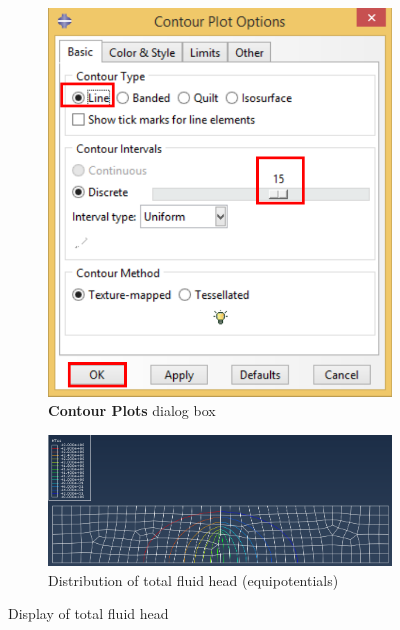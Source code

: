 \begin{itemize}
\begin{figure}[!h]
      \begin{subfigure}[!h]{0.40\textwidth}
        \includegraphics[width=\textwidth]{./body/images/post03.pdf}
        \caption{\textbf{Contour Plots} dialog box}
        \label{post03}
      \end{subfigure}%
      \begin{subfigure}[!h]{0.60\textwidth}
        \includegraphics[width=\textwidth]{./body/images/post04}
        \caption{Distribution of total fluid head (equipotentials)}
        \label{post04}
      \end{subfigure}%
      \caption{Display of total fluid head}
    \end{figure}


\end{itemize}
